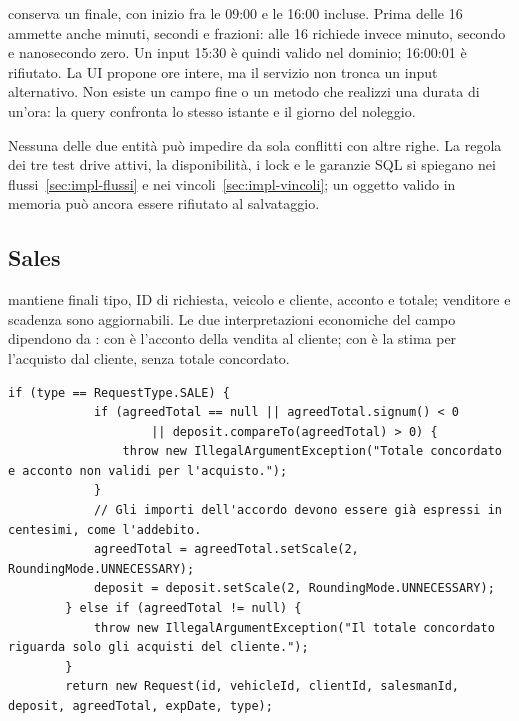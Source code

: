  conserva un  finale, con inizio
fra le 09:00 e le 16:00 incluse. Prima delle 16 ammette anche minuti,
secondi e frazioni: alle 16 richiede invece minuto, secondo e nanosecondo
zero. Un input 15:30 è quindi valido nel dominio; 16:00:01 è rifiutato.
La UI propone ore intere, ma il servizio non tronca un input alternativo.
Non esiste un campo fine o un metodo che realizzi una durata di un'ora:
la query confronta lo stesso istante e il giorno del noleggio.

Nessuna delle due entità può impedire da sola conflitti con altre righe.
La regola dei tre test drive attivi, la disponibilità, i lock e le
garanzie SQL si spiegano nei flussi~\ref{sec:impl-flussi} e
nei vincoli~\ref{sec:impl-vincoli}; un oggetto valido in memoria può
ancora essere rifiutato al salvataggio.

\subsection{Sales}
 mantiene finali tipo, ID di richiesta, veicolo e cliente,
acconto e totale;
venditore e scadenza sono aggiornabili. Le due interpretazioni economiche
del campo  dipendono da : con 
è l'acconto della vendita al cliente; con  è la stima per
l'acquisto dal cliente, senza totale concordato.

\noindent\begin{minipage}{\linewidth}
\begin{lstlisting}[firstnumber=54,caption={\code{Request.java}: forma dell'accordo e precisione degli importi.},
  label=lst:request-accordo]
        if (type == RequestType.SALE) {
            if (agreedTotal == null || agreedTotal.signum() < 0
                    || deposit.compareTo(agreedTotal) > 0) {
                throw new IllegalArgumentException("Totale concordato e acconto non validi per l'acquisto.");
            }
            // Gli importi dell'accordo devono essere già espressi in centesimi, come l'addebito.
            agreedTotal = agreedTotal.setScale(2, RoundingMode.UNNECESSARY);
            deposit = deposit.setScale(2, RoundingMode.UNNECESSARY);
        } else if (agreedTotal != null) {
            throw new IllegalArgumentException("Il totale concordato riguarda solo gli acquisti del cliente.");
        }
        return new Request(id, vehicleId, clientId, salesmanId, deposit, agreedTotal, expDate, type);
\end{lstlisting}
\end{minipage}


